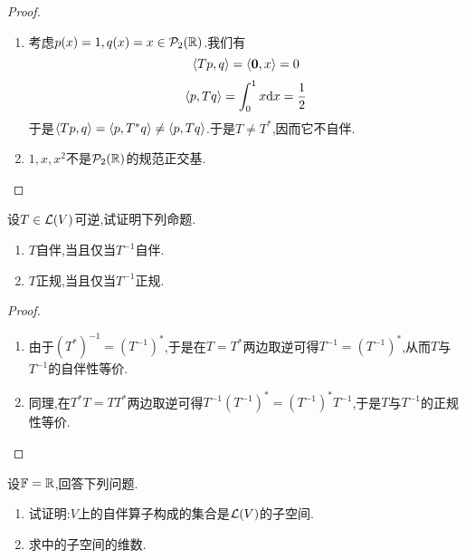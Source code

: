 \documentclass{ctexart}
\begin{document}
\begin{proof}
    \begin{enumerate}[label=\tbf{(\arabic*)}]
        \item 考虑$p(x)=1,q(x)=x\in\mathcal{P}_2(\mathbb{R})$.我们有
            \[\left\langle{Tp},{q}\right\rangle=\left\langle{\mathbf0},{x}\right\rangle=0\]
            \[\left\langle{p},{Tq}\right\rangle=\int_{0}^{1}x\mathrm{d} x=\dfrac12\]
            于是$\left\langle{Tp},{q}\right\rangle=\left\langle{p},{T^*q}\right\rangle\neq\left\langle{p},{Tq}\right\rangle$.于是$T\neq T^*$,因而它不自伴.
        \item $1,x,x^2$不是$\mathcal{P}_2(\mathbb{R})$的规范正交基.
    \end{enumerate}
\end{proof}
\begin{problem}[15.]
    设$T\in\mathcal{L}(V)$可逆,试证明下列命题.
    \begin{enumerate}[label=\tbf{(\arabic*)}]
        \item $T$自伴,当且仅当$T^{-1}$自伴.
        \item $T$正规,当且仅当$T^{-1}$正规.
    \end{enumerate}
\end{problem}
\begin{proof}
    \begin{enumerate}[label=\tbf{(\arabic*)}]
        \item 由于$\left(T^*\right)^{-1}=\left(T^{-1}\right)^*$,于是在$T=T^*$两边取逆可得$T^{-1}=\left(T^{-1}\right)^*$,从而$T$与$T^{-1}$的自伴性等价.
        \item 同理,在$T^*T=TT^*$两边取逆可得$T^{-1}\left(T^{-1}\right)^*=\left(T^{-1}\right)^*T^{-1}$,于是$T$与$T^{-1}$的正规性等价.
    \end{enumerate}
\end{proof}
\begin{problem}[16.]
    设$\mathbb{F}=\mathbb{R}$,回答下列问题.
    \begin{enumerate}[label=\tbf{(\arabic*)}]
        \item 试证明:$V$上的自伴算子构成的集合是$\mathcal{L}(V)$的子空间.
        \item 求中的子空间的维数.
    \end{enumerate}
\end{problem}
\end{document}
